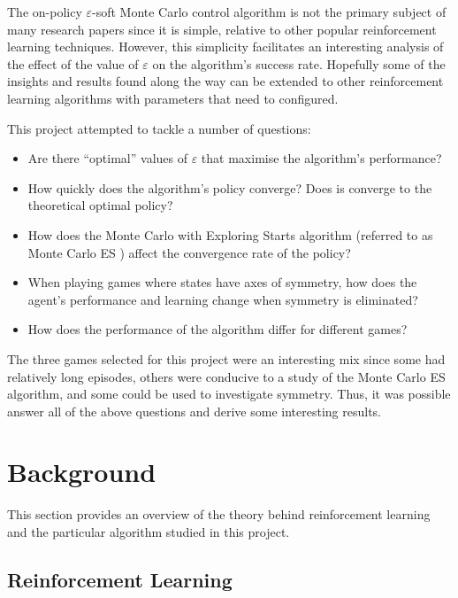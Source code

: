 \documentclass[11pt,a4paper]{report}
\begin{document}
The on-policy $\varepsilon$-soft Monte Carlo control algorithm is not the primary subject of many research papers since it is simple, relative to other popular reinforcement learning techniques. However, this simplicity facilitates an interesting analysis of the effect of the value of $\varepsilon$ on the algorithm's success rate. Hopefully some of the insights and results found along the way can be extended to other reinforcement learning algorithms with parameters that need to configured.

This project attempted to tackle a number of questions:

\begin{itemize}
	\item Are there ``optimal'' values of $\varepsilon$ that maximise the algorithm's performance?
	\item How quickly does the algorithm's policy converge? Does is converge to the theoretical optimal policy?
	\item How does the Monte Carlo with Exploring Starts algorithm (referred to as Monte Carlo ES \cite{rl-book}) affect the convergence rate of the policy?
	\item When playing games where states have axes of symmetry, how does the agent's 
performance and learning change when symmetry is eliminated?
	\item How does the performance of the algorithm differ for different games?
\end{itemize}

The three games selected for this project were an interesting mix since some had relatively long episodes, others were conducive to a study of the Monte Carlo ES algorithm, and some could be used to investigate symmetry. Thus, it was possible answer all of the above questions and derive some interesting results.



\chapter{Background}

This section provides an overview of the theory behind reinforcement learning and the particular algorithm studied in this project.

\section{Reinforcement Learning}
\label{sec:RL}
\end{document}
